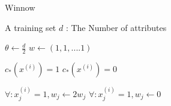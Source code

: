 \documentclass[a4paper]{article}
\begin{document}
      
      \begin{algorithm}
   \caption{Winnow ~\cite{winnowalgo1
   }
    }
   
   
   
  \begin{algorithmic}[1]
   \INPUT 
   \Statex A training set
   \Statex $d$ : The Number of attributes
   
  
  \State $\theta \leftarrow \frac{d}{2}$
  \State $w \leftarrow (1,1,....1)$
  
  
   \State $c_{*}(x^{(i)}) = 1$
   \Else
    \State $c_{*}(x^{(i)}) = 0$
  \EndIf
  
  \State $\forall : x_{j}^{(i)} = 1 , w_{j} \leftarrow 2w_{j} $
   \Else
    \State $\forall : x_{j}^{(i)} = 1 , w_{j} \leftarrow 0 $
  
   
   
  \EndIf
  
  
  
  \EndFor
  

    
   
    \end{algorithmic}
\end{algorithm} 
 \newpage







\end{document}
